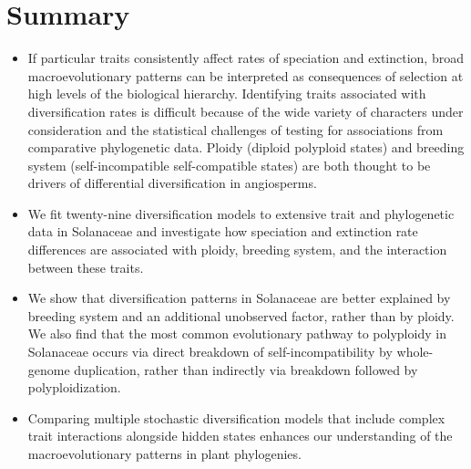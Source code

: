 \section{Summary}

\begin{itemize}

\item If particular traits consistently affect rates of speciation and extinction, broad macroevolutionary patterns can be interpreted as consequences of selection at high levels of the biological hierarchy.
Identifying traits associated with diversification rates is difficult because of the wide variety of characters under consideration and the statistical challenges of testing for associations from comparative phylogenetic data.
Ploidy (diploid \vs polyploid states) and breeding system (self-incompatible \vs self-compatible states) are both thought to be drivers of differential diversification in angiosperms.

\item  We fit twenty-nine diversification models to extensive trait and phylogenetic data in Solanaceae and investigate how speciation and extinction rate differences are associated with ploidy, breeding system, and the interaction between these traits.%

\item We show that diversification patterns in Solanaceae are better explained by breeding system and an additional unobserved factor, rather than by ploidy. 
We also find that the most common evolutionary pathway to polyploidy in Solanaceae occurs via direct breakdown of self-incompatibility by whole-genome duplication, rather than indirectly via breakdown followed by polyploidization.

\item Comparing multiple stochastic diversification models that include complex trait interactions alongside hidden states enhances our understanding of the macroevolutionary patterns in plant phylogenies. 

\end{itemize}
